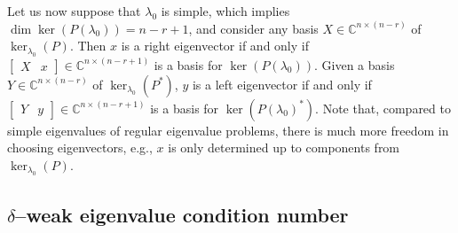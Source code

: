 \documentclass[12pt]{article}
\begin{document}
Let us now suppose that $\lambda_0$ is simple, which implies $\dim \ker(P(\lambda_0)) = n-r+1$, and consider any basis $X\in\mathbb{C}^{n\times(n-r)}$ of $\ker_{\lambda_0}(P)$. Then $x$ is a right eigenvector if and only if
$\begin{bmatrix} X & x \end{bmatrix} \in \mathbb{C}^{n\times (n-r+1)}$ is a basis for $\ker (P(\lambda_0))$. Given a basis $Y\in\mathbb{C}^{n\times(n-r)}$ of $\ker_{\lambda_0}(P^*)$, $y$ is a left eigenvector if and only if
$\begin{bmatrix} Y & y \end{bmatrix} \in \mathbb{C}^{n\times (n-r+1)}$ is a basis for $\ker (P(\lambda_0)^*)$. Note that, compared to simple eigenvalues of regular eigenvalue problems, there is much more freedom in choosing eigenvectors, e.g., $x$ is only determined up to components from $\ker_{\lambda_0}(P)$.

\subsection{$\delta$--weak eigenvalue condition number}\label{SectionDeltaWeak}
\end{document}
